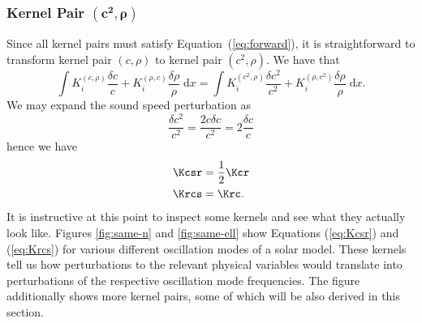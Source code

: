 \subsubsection*{Kernel Pair \texorpdfstring{$\mathbf{(c^2, \rho)}$}{(c2,rho)}}
\noindent
Since all kernel pairs must satisfy Equation~(\ref{eq:forward}), it is straightforward to transform kernel pair ${(c, \rho)}$ to kernel pair ${(c^2, \rho)}$. 
We have that
\begin{equation}
    \int K^{(c,\rho)}_i \frac{\delta c}{c} + K^{(\rho,c)}_i \frac{\delta \rho}{\rho} \; \text{d}x
    =
    \int K^{(c^2,\rho)}_i \frac{\delta c^2}{c^2} + K^{(\rho,c^2)}_i \frac{\delta \rho}{\rho} \; \text{d}x.
\end{equation}
We may expand the sound speed perturbation as
\begin{equation}
    \frac{\delta c^2}{c^2} = \frac{2 c\delta c}{c^2} = 2 \frac{\delta c}{c}
\end{equation}
hence we have
\begin{align}
    \Kcsr &= \frac{1}{2} \Kcr \label{eq:Kcsr}
\\  \Krcs &= \Krc. \label{eq:Krcs}
\end{align}
It is instructive at this point to inspect some kernels and see what they actually look like. Figures \ref{fig:same-n} and \ref{fig:same-ell} show Equations (\ref{eq:Kcsr}) and (\ref{eq:Krcs}) for various different oscillation modes of a solar model. 
These kernels tell us how perturbations to the relevant physical variables would translate into perturbations of the respective oscillation mode frequencies. 
The figure additionally shows more kernel pairs, some of which will be also derived in this section. 


